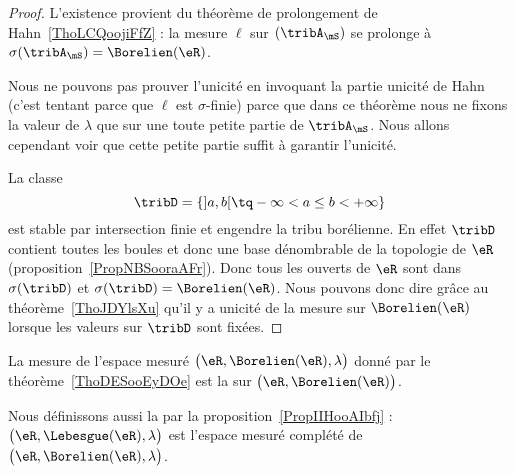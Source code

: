 \begin{proof}

    L'existence provient du théorème de prolongement de Hahn~\ref{ThoLCQoojiFfZ} : la mesure \( \ell\) sur \( (\tribA_{\mS})\) se prolonge à \( \sigma(\tribA_{\mS})=\Borelien(\eR)\).

    Nous ne pouvons pas prouver l'unicité en invoquant la partie unicité de Hahn (c'est tentant parce que \( \ell\) est \( \sigma\)-finie) parce que dans ce théorème nous ne fixons la valeur de \( \lambda\) que sur une toute petite partie de \( \tribA_{\mS}\). Nous allons cependant voir que cette petite partie suffit à garantir l'unicité.

    La classe
    \begin{equation}
        \tribD=\{ \mathopen] a , b \mathclose[\tq -\infty<a\leq b< +\infty \}
    \end{equation}
    est stable par intersection finie et engendre la tribu borélienne. En effet \( \tribD\) contient toutes les boules et donc une base dénombrable de la topologie de \( \eR\) (proposition~\ref{PropNBSooraAFr}). Donc tous les ouverts de \( \eR\) sont dans \( \sigma(\tribD)\) et \( \sigma(\tribD)=\Borelien(\eR)\). Nous pouvons donc dire grâce au théorème~\ref{ThoJDYlsXu} qu'il y a unicité de la mesure sur \( \Borelien(\eR)\) lorsque les valeurs sur \( \tribD\) sont fixées.
\end{proof}

\begin{definition}      \label{DefooYZSQooSOcyYN}
    La mesure de l'espace mesuré \( \big( \eR,\Borelien(\eR),\lambda \big)\) donné par le théorème~\ref{ThoDESooEyDOe} est la  sur \( \big( \eR,\Borelien(\eR) \big)\).

    Nous définissons aussi la  par la proposition~\ref{PropIIHooAIbfj} : \( \big( \eR,\Lebesgue(\eR),\lambda \big)\) est l'espace mesuré complété de \( \big( \eR,\Borelien(\eR), \lambda \big)\).
\end{definition}


